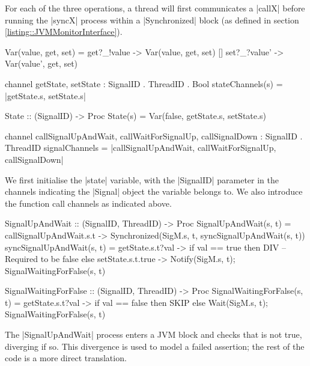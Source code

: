 For each of the three operations, a thread will first communicates a |callX| before running the |syncX| process within a |Synchronized| block (as defined in section \ref{listing::JVMMonitorInterface}).%

 \begin{cspm}[caption={The state variable(s) and the function call channels}]
Var(value, get, set) = 
  get?_!value -> Var(value, get, set)
[] set?_?value' -> Var(value', get, set)

channel getState, setState : SignalID . ThreadID . Bool
stateChannels(s) = {|getState.s, setState.s|}

State :: (SignalID) -> Proc
State(s) = Var(false, getState.s, setState.s)

channel callSignalUpAndWait, callWaitForSignalUp, callSignalDown : SignalID . ThreadID
signalChannels = {|callSignalUpAndWait, callWaitForSignalUp, callSignalDown|}
 \end{cspm}

We first initialise the |state| variable, with the |SignalID| parameter in the channels indicating the |Signal| object the variable belongs to. We also introduce the function call channels as indicated above.

\begin{cspm}[caption={The CSP model of the {\scalastyle signalUpAndWait} function of the {\scalastyle Signal} object}]
SignalUpAndWait :: (SignalID, ThreadID) -> Proc
SignalUpAndWait(s, t) = 
  callSignalUpAndWait.s.t -> Synchronized(SigM.s, t, syncSignalUpAndWait(s, t))
syncSignalUpAndWait(s, t) = 
  getState.s.t?val -> if val == true then DIV -- Required to be false
                      else setState.s.t.true -> 
                          Notify(SigM.s, t); SignalWaitingForFalse(s, t)


SignalWaitingForFalse :: (SignalID, ThreadID) -> Proc
SignalWaitingForFalse(s, t) = 
  getState.s.t?val -> if val == false then SKIP
                      else Wait(SigM.s, t); SignalWaitingForFalse(s, t)                            
\end{cspm}

The |SignalUpAndWait| process enters a JVM \inlineScala {} block and checks that  is not true, diverging if so. This divergence is used to model a failed assertion; the rest of the code is a more direct translation.

